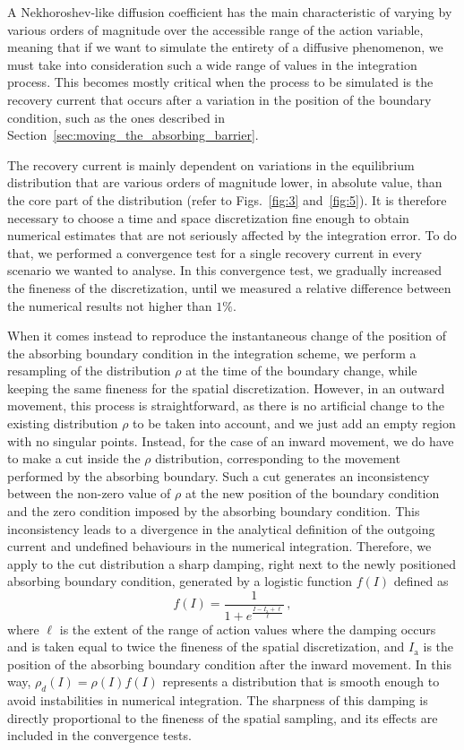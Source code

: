 {\begin{chapterappendices}
A Nekhoroshev-like diffusion coefficient has the main characteristic of varying by various orders of magnitude over the accessible range of the action variable, meaning that if we want to simulate the entirety of a diffusive phenomenon, we must take into consideration such a wide range of values in the integration process. This becomes mostly critical when the process to be simulated is the recovery current that occurs after a variation in the position of the boundary condition, such as the ones described in Section~\ref{sec:moving_the_absorbing_barrier}.

The recovery current is mainly dependent on variations in the equilibrium distribution that are various orders of magnitude lower, in absolute value, than the core part of the distribution (refer to Figs.~\ref{fig:3} and~\ref{fig:5}). It is therefore necessary to choose a time and space discretization fine enough to obtain numerical estimates that are not seriously affected by the integration error. To do that, we performed a convergence test for a single recovery current in every scenario we wanted to analyse. In this convergence test, we gradually increased the fineness of the discretization, until we measured a relative difference between the numerical results not higher than $1\%$.

When it comes instead to reproduce the instantaneous change of the position of the absorbing boundary condition in the integration scheme, we perform a resampling of the distribution $\rho$ at the time of the boundary change, while keeping the same fineness for the spatial discretization. However, in an outward movement, this process is straightforward, as there is no artificial change to the existing distribution $\rho$ to be taken into account, and we just add an empty region with no singular points. Instead, for the case of an inward movement, we do have to make a cut inside the $\rho$ distribution, corresponding to the movement performed by the absorbing boundary. Such a cut generates an inconsistency between the non-zero value of $\rho$ at the new position of the boundary condition and the zero condition imposed by the absorbing boundary condition. This inconsistency leads to a divergence in the analytical definition of the outgoing current and undefined behaviours in the numerical integration. Therefore, we apply to the cut distribution a sharp damping, right next to the newly positioned absorbing boundary condition, generated by a logistic function $f(I)$ defined as
\begin{equation}
    f(I) = \frac{1}{1 + e^{\frac{I-I_\text{a}+\ell}{\ell}}} \, , 
    \label{eq:logistic_damping}   
\end{equation}
where $\ell$ is the extent of the range of action values where the damping occurs and is taken equal to twice the fineness of the spatial discretization, and $I_\text{a}$ is the position of the absorbing boundary condition after the inward movement. In this way, $\rho_d(I) = \rho(I) f(I)$ represents a distribution that is smooth enough to avoid instabilities in numerical integration. The sharpness of this damping is directly proportional to the fineness of the spatial sampling, and its effects are included in the convergence tests.


\end{chapterappendices}}
